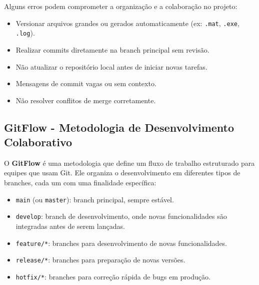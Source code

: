 Alguns erros podem comprometer a organização e a colaboração no projeto:
\begin{itemize}
    \item Versionar arquivos grandes ou gerados automaticamente (ex: \texttt{.mat}, \texttt{.exe}, \texttt{.log}).
    \item Realizar commits diretamente na branch principal sem revisão.
    \item Não atualizar o repositório local antes de iniciar novas tarefas.
    \item Mensagens de commit vagas ou sem contexto.
    \item Não resolver conflitos de merge corretamente.
\end{itemize}



\subsection{GitFlow - Metodologia de Desenvolvimento Colaborativo}

O \textbf{GitFlow} é uma metodologia que define um fluxo de trabalho estruturado para equipes que usam Git. Ele organiza o desenvolvimento em diferentes tipos de branches, cada um com uma finalidade específica:
\begin{itemize}
    \item \texttt{main} (ou \texttt{master}): branch principal, sempre estável.
    \item \texttt{develop}: branch de desenvolvimento, onde novas funcionalidades são integradas antes de serem lançadas.
    \item \texttt{feature/*}: branches para desenvolvimento de novas funcionalidades.
    \item \texttt{release/*}: branches para preparação de novas versões.
    \item \texttt{hotfix/*}: branches para correção rápida de bugs em produção.
\end{itemize}

